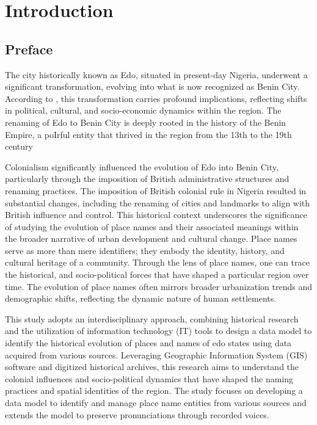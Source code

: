 \chapter{Introduction}
\section{Preface}
The city historically known as Edo, situated in present-day Nigeria, underwent a significant transformation, evolving into what is now recognized as Benin City. According to \cite{Michael2023}, this transformation carries profound implications, reflecting shifts in political, cultural, and socio-economic dynamics within the region. The renaming of Edo to Benin City is deeply rooted in the history of the Benin Empire, a poIrful entity that thrived in the region from the 13th to the 19th century\cite{egharevba1968short} 

Colonialism significantly influenced the evolution of Edo into Benin City, particularly through the imposition of British administrative structures and renaming practices. The imposition of British colonial rule in Nigeria resulted in substantial changes, including the renaming of cities and landmarks to align with British influence and control\cite{falola2008history}. This historical context underscores the significance of studying the evolution of place names and their associated meanings within the broader narrative of urban development and cultural change.
Place names serve as more than mere identifiers; they embody the identity, history, and cultural heritage of a community\cite{Gelling}. Through the lens of place names, one can trace the historical, and socio-political forces that have shaped a particular region over time. The evolution of place names often mirrors broader urbanization trends and demographic shifts, reflecting the dynamic nature of human settlements.

This study adopts an interdisciplinary approach, combining historical research and the utilization of information technology (IT) tools to design a data model to identify the historical evolution of places and names of edo states using data acquired from various sources. Leveraging Geographic Information System (GIS) software and digitized historical archives, this research aims to understand the colonial influences and socio-political dynamics that have shaped the naming practices and spatial identities of the region. The study focuses on developing a data model to identify and manage place name entities from various sources and extends the model to preserve pronunciations through recorded voices.

